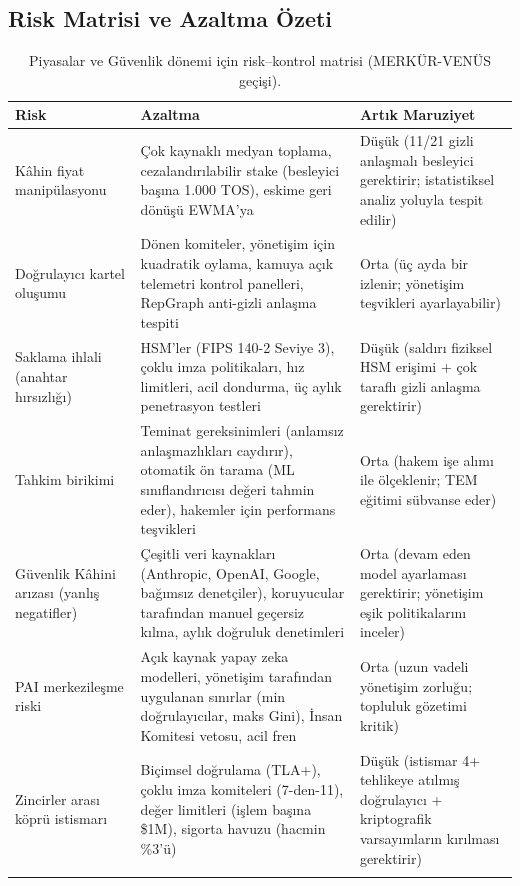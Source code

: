 \documentclass[11pt]{article}
\begin{document}
\subsection{Risk Matrisi ve Azaltma Özeti}
\begin{longtable}{@{}p{}p{}p{}@{}}
\toprule
\textbf{Risk} & \textbf{Azaltma} & \textbf{Artık Maruziyet} \\\midrule
Kâhin fiyat manipülasyonu & Çok kaynaklı medyan toplama, cezalandırılabilir stake (besleyici başına 1.000 TOS), eskime geri dönüşü EWMA'ya & Düşük (11/21 gizli anlaşmalı besleyici gerektirir; istatistiksel analiz yoluyla tespit edilir) \\
Doğrulayıcı kartel oluşumu & Dönen komiteler, yönetişim için kuadratik oylama, kamuya açık telemetri kontrol panelleri, RepGraph anti-gizli anlaşma tespiti & Orta (üç ayda bir izlenir; yönetişim teşvikleri ayarlayabilir) \\
Saklama ihlali (anahtar hırsızlığı) & HSM'ler (FIPS 140-2 Seviye 3), çoklu imza politikaları, hız limitleri, acil dondurma, üç aylık penetrasyon testleri & Düşük (saldırı fiziksel HSM erişimi + çok taraflı gizli anlaşma gerektirir) \\
Tahkim birikimi & Teminat gereksinimleri (anlamsız anlaşmazlıkları caydırır), otomatik ön tarama (ML sınıflandırıcısı değeri tahmin eder), hakemler için performans teşvikleri & Orta (hakem işe alımı ile ölçeklenir; TEM eğitimi sübvanse eder) \\
Güvenlik Kâhini arızası (yanlış negatifler) & Çeşitli veri kaynakları (Anthropic, OpenAI, Google, bağımsız denetçiler), koruyucular tarafından manuel geçersiz kılma, aylık doğruluk denetimleri & Orta (devam eden model ayarlaması gerektirir; yönetişim eşik politikalarını inceler) \\
PAI merkezileşme riski & Açık kaynak yapay zeka modelleri, yönetişim tarafından uygulanan sınırlar (min doğrulayıcılar, maks Gini), İnsan Komitesi vetosu, acil fren & Orta (uzun vadeli yönetişim zorluğu; topluluk gözetimi kritik) \\
Zincirler arası köprü istismarı & Biçimsel doğrulama (TLA+), çoklu imza komiteleri (7-den-11), değer limitleri (işlem başına \$1M), sigorta havuzu (hacmin \%3'ü) & Düşük (istismar 4+ tehlikeye atılmış doğrulayıcı + kriptografik varsayımların kırılması gerektirir) \\\bottomrule
\caption{Piyasalar ve Güvenlik dönemi için risk--kontrol matrisi (MERKÜR-VENÜS geçişi).}
\label{tab:risk-markets-expanded}
\end{longtable}
\end{document}
